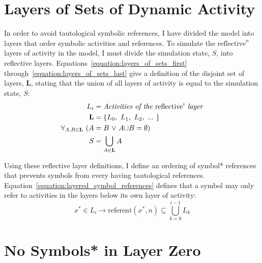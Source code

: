 \section{Layers of Sets of Dynamic Activity}

In order to avoid tautological symbolic references, I have divided the
model into layers that order symbolic activities and references.  To
simulate the $\text{reflective}^n$ layers of activity in the model, I
must divide the simulation state, $S$, into reflective layers.
Equations~\ref{equation:layers_of_sets_first}
through~\ref{equation:layers_of_sets_last} give a definition of the
disjoint set of layers, $\mathbf{L}$, stating that the union of all
layers of activity is equal to the simulation state, $S$:
\begin{align}
\label{equation:layers_of_sets_first}
                            L_i &= \text{\emph{Activities of the} }\text{reflective}^i\text{ \emph{layer}} \\
                     \mathbf{L} &= \{L_0, ~L_1, ~L_2, ~...~ \} \\
\forall_{A,B{\in}{\mathbf{L}}} ~ (A &= B ~{\vee}~ A{\cup}B = {\emptyset}) \\
\label{equation:layers_of_sets_last}
                      S &= \bigcup_{A{\in}\mathbf{L}}{A}
\end{align}

Using these reflective layer definitions, I define an ordering of
symbol* references that prevents symbols from every having
tautological references.
Equation~\ref{equation:layered_symbol_references} defines that a
symbol may only refer to activities in the layers below its own layer
of activity:
\begin{equation}
\label{equation:layered_symbol_references}
x^* \in L_i \rightarrow \text{referent}(x^*, n) \subseteq \bigcup_{k=0}^{i-1}{L_k}
\end{equation}

\section{No Symbols* in Layer Zero}

